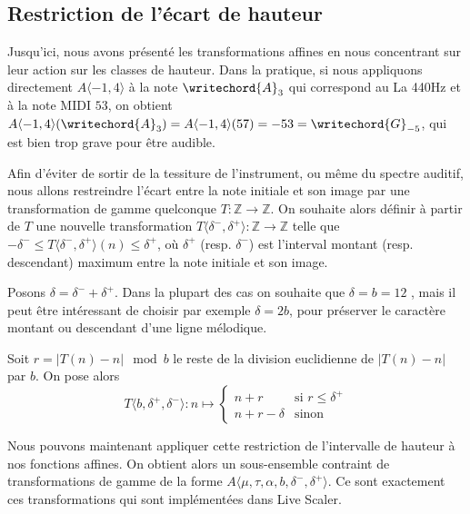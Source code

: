 \subsection{Restriction de l'écart de hauteur}
Jusqu'ici, nous avons présenté les transformations affines en nous concentrant sur leur action sur les classes de hauteur. Dans la pratique, si nous appliquons directement $A\langle -1,4 \rangle$ à la note  $\writechord{A}_3$ qui correspond au La 440Hz et à la note MIDI $53$, on obtient $A\langle -1,4 \rangle(\writechord{A}_3) = A\langle -1,4 \rangle(57) = -53 = \writechord{G}_{-5}$, qui est bien trop grave pour être audible. 

Afin d'éviter de sortir de la tessiture de l'instrument, ou même du spectre auditif, nous allons restreindre l'écart entre la note initiale et son image par une transformation de gamme quelconque $T : \mathbb{Z}\rightarrow \mathbb{Z}$. On souhaite alors définir à partir de $T$ une nouvelle transformation $T\langle \delta^-, \delta^+\rangle : \mathbb{Z}\rightarrow \mathbb{Z}$ telle que $ - \delta^- \leq T\langle \delta^-, \delta^+\rangle(n) \leq \delta ^+$, où $\delta^+$ (resp. $\delta^-$) est l'interval montant (resp. descendant) maximum entre la note initiale et son image.

Posons $\delta = \delta^- + \delta^+$.  Dans la plupart des cas on souhaite que $\delta = b = 12$ , mais il peut être intéressant de choisir par exemple $\delta  = 2b$, pour préserver le caractère montant ou descendant d'une ligne mélodique.

Soit $r = |T(n) - n | \mod b$ le reste de la division euclidienne de  $|T(n) - n |$ par $b$. On pose alors 
$$
T\langle b, \delta^+, \delta^- \rangle : n \mapsto \begin{cases}
  n + r & \text{si $r \leq \delta^+$}\\
  n + r - \delta & \text{sinon}
\end{cases}
$$

Nous pouvons maintenant appliquer cette restriction de l'intervalle de hauteur à nos fonctions affines. On obtient alors un sous-ensemble contraint de transformations de gamme de la forme $A\langle \mu, \tau, \alpha, b, \delta^-, \delta^+\rangle$. Ce sont exactement ces transformations qui sont implémentées dans Live Scaler.
  

